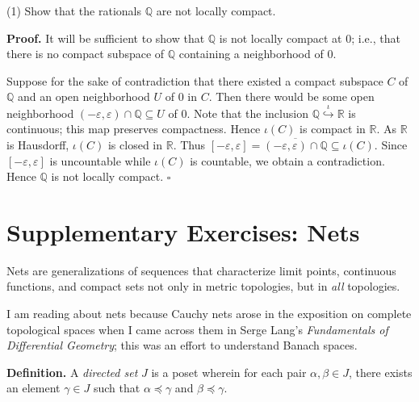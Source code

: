 \documentclass[a4paper]{article}
\newcommand{\R}{\mathbb{R}}
\newcommand{\Q}{\mathbb{Q}}
\begin{document}
(1) Show that the rationals $\Q$ are not locally compact.

\textbf{Proof.} It will be sufficient to show that $\Q$ is not locally compact at $0$; i.e., that there is no compact subspace of $\Q$ containing a neighborhood of $0$.

Suppose for the sake of contradiction that there existed a compact subspace $C$ of $\Q$ and an open neighborhood $U$ of $0$ in $C$. Then there would be some open neighborhood $(-\varepsilon, \varepsilon) \cap \Q \subseteq U$ of $0$. Note that the inclusion $\Q \overset{\iota}{\hookrightarrow} \R$ is continuous; this map preserves compactness. Hence $\iota(C)$ is compact in $\R$. As $\R$ is Hausdorff, $\iota(C)$ is closed in $\R$. Thus $[-\varepsilon, \varepsilon] = \overline{(-\varepsilon, \varepsilon) \cap \Q} \subseteq \iota(C)$. Since $[-\varepsilon, \varepsilon]$ is uncountable while $\iota(C)$ is countable, we obtain a contradiction. Hence $\Q$ is not locally compact. $\square$

\section*{Supplementary Exercises: Nets}

Nets are generalizations of sequences that characterize limit points, continuous functions, and compact sets not only in metric topologies, but in \emph{all} topologies.

I am reading about nets because Cauchy nets arose in the exposition on complete topological spaces when I came across them in Serge Lang's \emph{Fundamentals of Differential Geometry}; this was an effort to understand Banach spaces.

\textbf{Definition.} A \emph{directed set} $J$ is a poset wherein for each pair $\alpha, \beta \in J$, there exists an element $\gamma \in J$ such that $\alpha \preceq \gamma$ and $\beta \preceq \gamma$.
\end{document}
